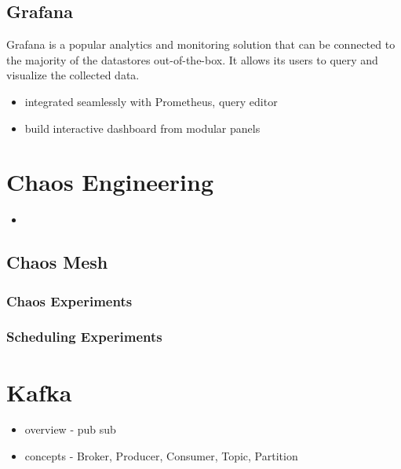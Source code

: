 \subsection{Grafana}

Grafana is a popular analytics and monitoring solution that can be connected to the majority of the datastores out-of-the-box. It allows its users to query and visualize the collected data.

\begin{itemize}
	\item integrated seamlessly with Prometheus, query editor
	\item build interactive dashboard from modular panels
\end{itemize}

\section{Chaos Engineering}

\begin{itemize}
	\item 
\end{itemize}

\subsection{Chaos Mesh} \label{background-chaos-mesh}

\subsubsection{Chaos Experiments}

\subsubsection{Scheduling Experiments}

\section{Kafka} \label{background-kafka}

\begin{itemize}
	\item overview - pub sub
	\item concepts - Broker, Producer, Consumer, Topic, Partition
\end{itemize}

